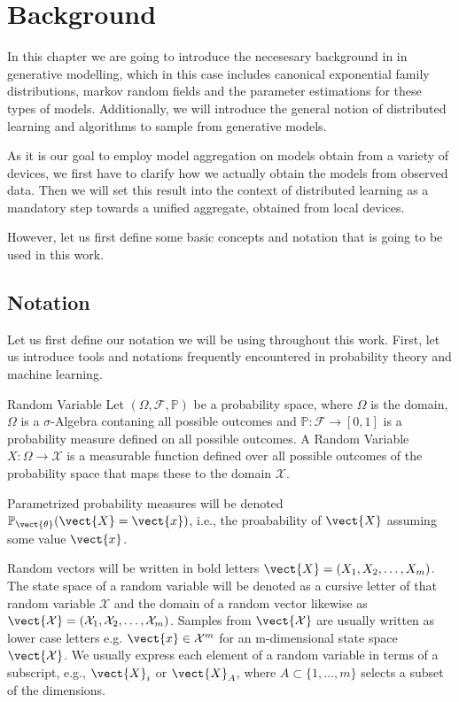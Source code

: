 \chapter{Background}
\label{chapter:kap2}
In this chapter we are going to introduce the necesesary background in in generative modelling, which in this case includes canonical exponential family distributions, markov random fields and the parameter estimations for these types of models.
Additionally, we will introduce the general notion of distributed learning and algorithms to sample from generative models.

As it is our goal to employ model aggregation on models obtain from a variety of devices, we first have to clarify how we actually obtain the models from observed data. 
Then we will set this result into the context of distributed learning as a mandatory step towards a unified aggregate, obtained from local devices.

However, let us first define some basic concepts and notation that is going to be used in this work.
\section{Notation}
    \label{sec:nota}
    Let us first define our notation we will be using throughout this work.
    First, let us introduce tools and notations frequently encountered in probability theory and machine learning.
    

    \begin{definition}{Random Variable}
        \label{def:randvar}
        Let $(\Omega, \mathcal{F}, \mathbb{P})$ be a probability space, where $\Omega$ is the domain, $\Omega$ is a $\sigma$-Algebra contaning all possible outcomes and $\mathbb{P}: \mathcal{F} \rightarrow [0,1]$ is a probability measure defined on all possible outcomes.
        A Random Variable $X: \Omega \rightarrow \mathcal{X}$ is a measurable function defined over all possible outcomes of the probability space that maps these to the domain $\mathcal{X}$.

        Parametrized probability measures will be denoted $\mathbb{P}_{\vect{\theta}} (\vect{X} = \vect{x})$, i.e., the proabability of $\vect{X}$ assuming some value $\vect{x}$.
    \end{definition}

    Random vectors will be written in bold letters $\vect{X} = (X_1, X_2, \ldots, X_m)$.
    The state space of a random variable will be denoted as a cursive letter of that random variable $\mathcal{X}$ and the domain of a random vector likewise as $\vect{\mathcal{X}} = (\mathcal{X}_1, \mathcal{X}_2, \ldots, \mathcal{X}_m)$.
    Samples from $\vect{\mathcal{X}}$ are usually written as lower case letters e.g. $\vect{x} \in \mathcal{X}^m$ for an m-dimensional state space $\vect{\mathcal{X}}$.
    We usually express each element of a random variable in terms of a subscript, e.g., $\vect{X}_i$ or $\vect{X}_A$, where $A \subset\{1, \ldots, m\} $ selects a subset of the dimensions.

